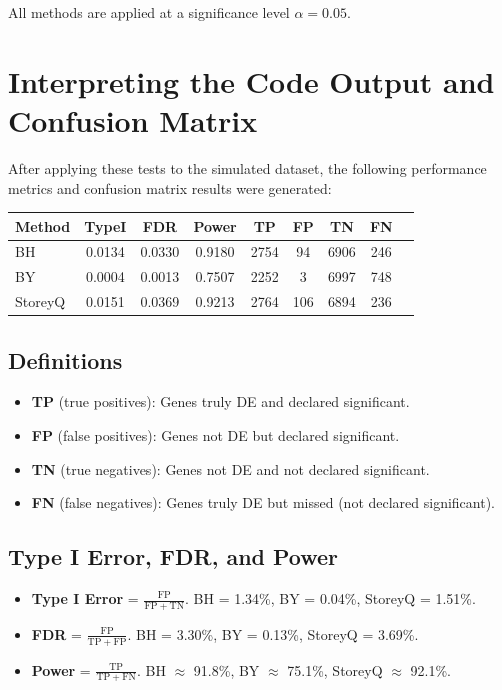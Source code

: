\documentclass[12pt]{article}
\begin{document}
All methods are applied at a significance level $\alpha = 0.05$.

\section{Interpreting the Code Output and Confusion Matrix}

After applying these tests to the simulated dataset, the following performance metrics and confusion matrix results were generated:

\begin{center}
\begin{tabular}{lcccccccc}
\toprule
\textbf{Method} & \textbf{TypeI} & \textbf{FDR} & \textbf{Power} & \textbf{TP} & \textbf{FP} & \textbf{TN} & \textbf{FN}\\
\midrule
BH       & 0.0134 & 0.0330 & 0.9180 & 2754 & 94  & 6906 & 246 \\
BY       & 0.0004 & 0.0013 & 0.7507 & 2252 & 3   & 6997 & 748 \\
StoreyQ  & 0.0151 & 0.0369 & 0.9213 & 2764 & 106 & 6894 & 236 \\
\bottomrule
\end{tabular}
\end{center}

\subsection{Definitions}
\begin{itemize}
    \item \textbf{TP} (true positives): Genes truly DE and declared significant.
    \item \textbf{FP} (false positives): Genes not DE but declared significant.
    \item \textbf{TN} (true negatives): Genes not DE and not declared significant.
    \item \textbf{FN} (false negatives): Genes truly DE but missed (not declared significant).
\end{itemize}

\subsection{Type I Error, FDR, and Power}
\begin{itemize}
    \item \textbf{Type I Error} = $\frac{\mathrm{FP}}{\mathrm{FP}+\mathrm{TN}}$. BH = 1.34\%, BY = 0.04\%, StoreyQ = 1.51\%.
    \item \textbf{FDR} = $\frac{\mathrm{FP}}{\mathrm{TP} + \mathrm{FP}}$. BH = 3.30\%, BY = 0.13\%, StoreyQ = 3.69\%.
    \item \textbf{Power} = $\frac{\mathrm{TP}}{\mathrm{TP} + \mathrm{FN}}$. BH $\approx$ 91.8\%, BY $\approx$ 75.1\%, StoreyQ $\approx$ 92.1\%.
\end{itemize}
\end{document}
